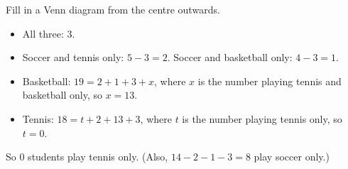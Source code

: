 Fill in a Venn diagram from the centre outwards.
\begin{itemize}
\item All three: $3$.
\item Soccer and tennis only: $5-3=2$. Soccer and basketball only: $4-3=1$.
\item Basketball: $19=2+1+3+x$, where $x$ is the number playing tennis and basketball only, so $x=13$.
\item Tennis: $18=t+2+13+3$, where $t$ is the number playing tennis only, so $t=0$.
\end{itemize}
So $\boxed{0}$ students play tennis only. (Also, $14-2-1-3=8$ play soccer only.)
